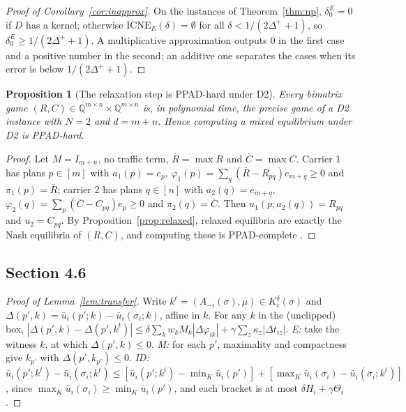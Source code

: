 \documentclass[preprint,12pt]{elsarticle}
\newtheorem{proposition}[theorem]{Proposition}
\theoremstyle{definition}
\theoremstyle{remark}
\newcommand{\ub}{\bar u}
\newcommand{\ICNE}{\mathrm{ICNE}}
\begin{document}
\begin{proof}[Proof of Corollary~\ref{cor:inapprox}]
On the instances of Theorem~\ref{thm:np}, $\delta_0^E=0$ if $D$ has a kernel; otherwise $\ICNE_E(\delta)=\emptyset$ for all $\delta<1/(2\Delta^++1)$, so $\delta_0^E\ge1/(2\Delta^++1)$. A multiplicative approximation outputs $0$ in the first case and a positive number in the second; an additive one separates the cases when its error is below $1/(2\Delta^++1)$.
\end{proof}

\begin{proposition}[The relaxation step is PPAD-hard under D2]\label{prop:ppad}
Every bimatrix game $(R,C)\in\mathbb Q^{m\times n}\times\mathbb Q^{m\times n}$ is, in polynomial time, the precise game of a D2 instance with $N=2$ and $d=m+n$. Hence computing a mixed equilibrium under D2 is PPAD-hard.
\end{proposition}
\begin{proof}
Let $M=I_{m+n}$, no traffic term, $\bar R=\max R$ and $\bar C=\max C$. Carrier 1 has plans $p\in[m]$ with $a_1(p)=e_p$, $\varphi_1(p)=\sum_q(\bar R-R_{pq})e_{m+q}\ge0$ and $\pi_1(p)=\bar R$; carrier 2 has plans $q\in[n]$ with $a_2(q)=e_{m+q}$, $\varphi_2(q)=\sum_p(\bar C-C_{pq})e_p\ge0$ and $\pi_2(q)=\bar C$. Then $u_1(p;a_2(q))=R_{pq}$ and $u_2=C_{pq}$. By Proposition~\ref{prop:relaxed}, relaxed equilibria are exactly the Nash equilibria of $(R,C)$, and computing these is PPAD-complete \citep{Chen2009,Daskalakis2009}.
\end{proof}

\subsection{Section 4.6}

\begin{proof}[Proof of Lemma~\ref{lem:transfer}]
Write $k^t=(A_{-i}(\sigma),\mu)\in K_i^\delta(\sigma)$ and $\Delta(p',k)=\ub_i(p';k)-\ub_i(\sigma_i;k)$, affine in $k$. For any $k$ in the (unclipped) box, $|\Delta(p',k)-\Delta(p',k^t)|\le\delta\sum_kw_kM_k|\Delta\varphi_{ik}|+\gamma\sum_z\kappa_z|\Delta t_{iz}|$. \emph{E:} take the witness $k$, at which $\Delta(p',k)\le0$. \emph{M:} for each $p'$, maximality and compactness give $k_{p'}$ with $\Delta(p',k_{p'})\le0$. \emph{ID:} $\ub_i(p';k^t)-\ub_i(\sigma_i;k^t)\le[\ub_i(p';k^t)-\min_K\ub_i(p')]+[\max_K\ub_i(\sigma_i)-\ub_i(\sigma_i;k^t)]$, since $\max_K\ub_i(\sigma_i)\ge\min_K\ub_i(p')$, and each bracket is at most $\delta H_i+\gamma\Theta_i$.
\end{proof}
\end{document}

